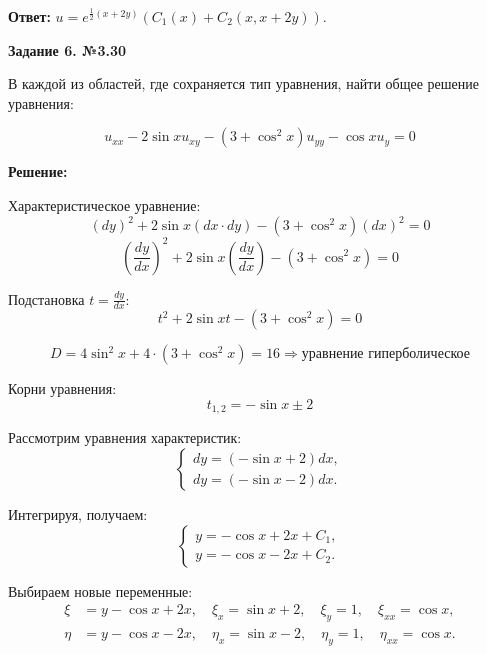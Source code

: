 \documentclass[a4paper,12pt]{article}
\begin{document}
\textbf{Ответ:} $u = e^{\frac{1}{2}(x+2y)} ( C_1(x) + C_2(x, x+2y) ).$

\vspace{51mm}
\begin{center}    
    \textbf{Задание 6. №3.30}
\end{center}

В каждой из областей, где сохраняется тип уравнения, найти общее решение уравнения:

\begin{equation*}
    u_{xx} - 2\sin{x} u_{xy} - (3 + \cos^2{x})u_{yy} - \cos{x} u_{y} = 0
\end{equation*}

\textbf{Решение:}

Характеристическое уравнение:
\begin{equation*}
    (dy)^2 + 2\sin{x} (dx \cdot dy) - (3 + \cos^2{x}) (dx)^2 = 0
\end{equation*}
\begin{equation*}
   \left( \frac{dy}{dx} \right)^2 + 2\sin{x} \left( \frac{dy}{dx} \right)- (3 + \cos^2{x}) = 0
\end{equation*}

Подстановка $t = \frac{dy}{dx}$:
\begin{equation*}
    t^2 + 2\sin{x} t - (3 + \cos^2{x}) = 0
\end{equation*}

\begin{equation*}
    D = 4\sin^2{x} + 4\cdot(3 + \cos^2{x}) = 16 \Rightarrow \text{уравнение гиперболическое}
\end{equation*}

Корни уравнения:
\begin{equation*}
    t_{1,2} = -\sin{x} \pm 2
\end{equation*}

Рассмотрим уравнения характеристик:
\[
\begin{cases}
    dy = (-\sin{x} + 2)dx, \\
    dy = (-\sin{x} - 2)dx.
\end{cases}
\]

Интегрируя, получаем:
\[
\begin{cases}
    y = -\cos{x} + 2x + C_1, \\
    y = -\cos{x} - 2x + C_2.
\end{cases}
\]

Выбираем новые переменные:
\begin{align*}
   \xi &= y - \cos{x} + 2x, \quad \xi_x = \sin{x} + 2, \quad \xi_y = 1, \quad \xi_{xx} = \cos{x}, \\
   \eta &= y - \cos{x} - 2x, \quad \eta_x = \sin{x} - 2, \quad \eta_y = 1,  \quad \eta_{xx} = \cos{x}.
\end{align*}
\end{document}
